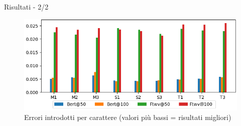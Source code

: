\documentclass{beamer}
\begin{document}
\begin{frame}{Risultati - 2/2}
\begin{figure}[H]
\includegraphics[width=\textwidth]{images/test/if}
\caption{Errori introdotti per carattere (valori più bassi = risultati migliori)}
\end{figure}
\end{frame}

%
%
\end{document}

